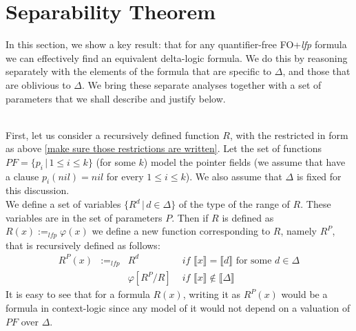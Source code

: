 	\section{Separability Theorem}
In this section, we show a key result: that for any quantifier-free FO+\textit{lfp} formula we can effectively find an equivalent delta-logic formula. We do this by reasoning separately with the elements of the formula that are specific to $\Delta{}$, and those that are oblivious to $\Delta{}$. We bring these separate analyses together with a set of parameters that we shall describe and justify below.\\\

First, let us consider a recursively defined function $R$, with the restricted in form as above \ref{make sure those restrictions are written}. Let the set of functions $PF = \{ p_i \,|\, 1 \leq{} i \leq{} k \}$ (for some $k$) model the pointer fields (we assume that have a clause $p_i(nil) = nil$ for every $1 \leq{} i \leq{} k$). We also assume that $\Delta{}$ is fixed for this discussion.\\
We define a set of variables $\{R^{d}\,|\, d \in{} \Delta{} \}$ of the type of the range of $R$. These variables are in the set of parameters $P$. Then if $R$ is defined as $R(x) :=_\textit{lfp} \varphi{}(x)$ we define a new function corresponding to $R$, namely $R^{P}$, that is recursively defined as follows:\\
\begin{align}
R^{P}(x) & :=_\textit{lfp} & R^{d} & \textit{ if } \llbracket{}x\rrbracket{} = \llbracket{} d \rrbracket{} \textrm{ for some } d \in{}\Delta{}\tag{delta case}\\
& & \varphi{}[R^{P}/R] & \textit{ if } \llbracket{}x\rrbracket{} \notin{} \llbracket{}\Delta{}\rrbracket{} \tag{recursive case}
\end{align}  
It is easy to see that for a formula $R(x)$, writing it as $R^{P}(x)$ would be a formula in context-logic since any model of it would not depend on a valuation of $PF$ over $\Delta{}$.\\\

